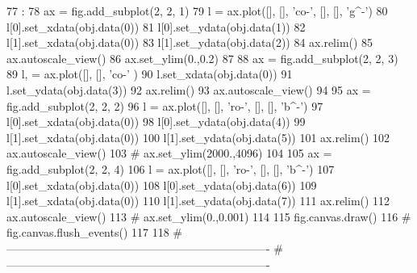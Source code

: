 \begin{DoxyCode}
77                         :
78     ax = fig.add_subplot(2, 2, 1)
79     l = ax.plot([], [], 'co-', [], [], 'g^-')
80     l[0].set_xdata(obj.data(0))
81     l[0].set_ydata(obj.data(1))
82     l[1].set_xdata(obj.data(0))
83     l[1].set_ydata(obj.data(2))
84     ax.relim()
85     ax.autoscale_view()
86     ax.set_ylim(0.,0.2)
87 
88     ax = fig.add_subplot(2, 2, 3)
89     l, = ax.plot([], [], 'co-' )
90     l.set_xdata(obj.data(0))
91     l.set_ydata(obj.data(3))
92     ax.relim()
93     ax.autoscale_view()
94 
95     ax = fig.add_subplot(2, 2, 2)
96     l = ax.plot([], [], 'ro-', [], [], 'b^-')
97     l[0].set_xdata(obj.data(0))
98     l[0].set_ydata(obj.data(4))
99     l[1].set_xdata(obj.data(0))
100     l[1].set_ydata(obj.data(5))
101     ax.relim()
102     ax.autoscale_view()
103 #    ax.set_ylim(2000.,4096)
104 
105     ax = fig.add_subplot(2, 2, 4)
106     l = ax.plot([], [], 'ro-', [], [], 'b^-')
107     l[0].set_xdata(obj.data(0))
108     l[0].set_ydata(obj.data(6))
109     l[1].set_xdata(obj.data(0))
110     l[1].set_ydata(obj.data(7))
111     ax.relim()
112     ax.autoscale_view()
113 #    ax.set_ylim(0.,0.001)
114 
115     fig.canvas.draw()
116 #    fig.canvas.flush_events()
117 
118 #----------------------------------------------------------------------
#----------------------------------------------------------------------
\end{DoxyCode}
